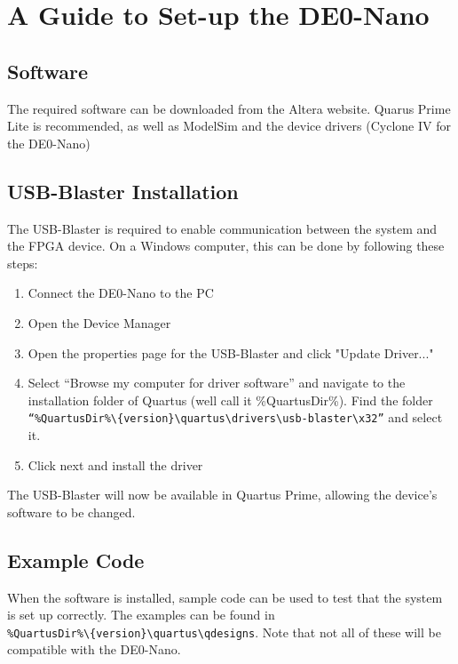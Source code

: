 \chapter{A Guide to Set-up the DE0-Nano}
\label{appendix:B}

\section{Software}
The required software can be downloaded from the Altera website. Quarus Prime Lite is recommended, as well as ModelSim and the device drivers (Cyclone IV for the DE0-Nano) \cite{QuartusDownloadPage}

\section{USB-Blaster Installation}
The USB-Blaster is required to enable communication between the system and the FPGA device. On a Windows computer, this can be done by following these steps:

\begin{enumerate}
	\item Connect the DE0-Nano to the PC
	\item Open the Device Manager
	\item Open the properties page for the USB-Blaster and click "Update Driver..."
	\item Select “Browse my computer for driver software” and navigate to the installation folder of Quartus (we\textsc{}ll call it \%QuartusDir\%). Find the folder \texttt{“\%QuartusDir\%\textbackslash\{version\}\textbackslash quartus\textbackslash drivers\textbackslash usb-blaster\textbackslash x32”} and select it.
	\item Click next and install the driver	
\end{enumerate}

The USB-Blaster will now be available in Quartus Prime, allowing the device's software to be changed.

\section{Example Code}
When the software is installed, sample code can be used to test that the system is set up correctly. The examples can be found in \\ \texttt{\%QuartusDir\%\textbackslash\{version\}\textbackslash quartus\textbackslash qdesigns}. Note that not all of these will be compatible with the DE0-Nano.

